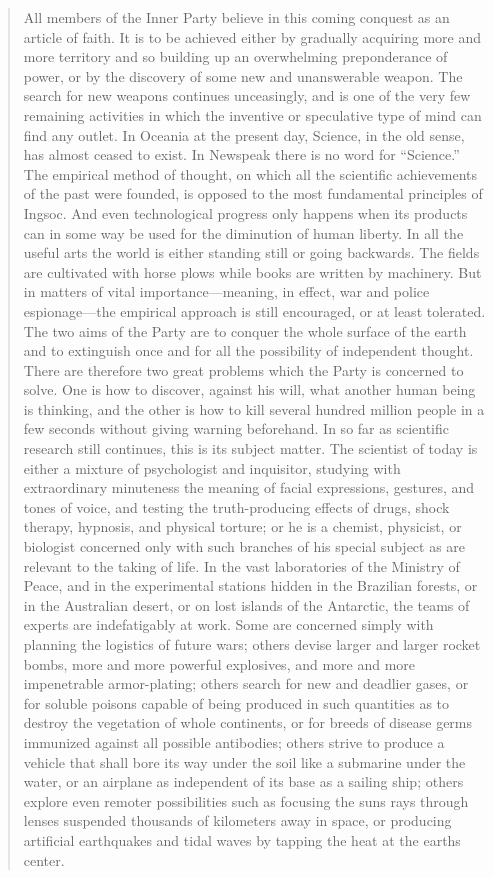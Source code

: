 \begin{quotation}
All members of the Inner Party believe in this coming conquest as an
article of faith. It is to be achieved either by gradually acquiring
more and more territory and so building up an overwhelming preponderance
of power, or by the discovery of some new and unanswerable weapon. The
search for new weapons continues unceasingly, and is one of the very few
remaining activities in which the inventive or speculative type of mind
can find any outlet. In Oceania at the present day, Science, in the old
sense, has almost ceased to exist. In Newspeak there is no word for
``Science.'' The empirical method of thought, on which all the scientific
achievements of the past were founded, is opposed to the most
fundamental principles of Ingsoc. And even technological progress only
happens when its products can in some way be used for the diminution of
human liberty. In all the useful arts the world is either standing still
or going backwards. The fields are cultivated with horse plows while
books are written by machinery. But in matters of vital
importance---meaning, in effect, war and police espionage---the
empirical approach is still encouraged, or at least tolerated. The two
aims of the Party are to conquer the whole surface of the earth and to
extinguish once and for all the possibility of independent thought.
There are therefore two great problems which the Party is concerned to
solve. One is how to discover, against his will, what another human
being is thinking, and the other is how to kill several hundred million
people in a few seconds without giving warning beforehand. In so far as
scientific research still continues, this is its subject matter. The
scientist of today is either a mixture of psychologist and inquisitor,
studying with extraordinary minuteness the meaning of facial
expressions, gestures, and tones of voice, and testing the
truth-producing effects of drugs, shock therapy, hypnosis, and physical
torture; or he is a chemist, physicist, or biologist concerned only with
such branches of his special subject as are relevant to the taking of
life. In the vast laboratories of the Ministry of Peace, and in the
experimental stations hidden in the Brazilian forests, or in the
Australian desert, or on lost islands of the Antarctic, the teams of
experts are indefatigably at work. Some are concerned simply with
planning the logistics of future wars; others devise larger and larger
rocket bombs, more and more powerful explosives, and more and more
impenetrable armor-plating; others search for new and deadlier gases, or
for soluble poisons capable of being produced in such quantities as to
destroy the vegetation of whole continents, or for breeds of disease
germs immunized against all possible antibodies; others strive to
produce a vehicle that shall bore its way under the soil like a
submarine under the water, or an airplane as independent of its base as
a sailing ship; others explore even remoter possibilities such as
focusing the sun\textquotesingle s rays through lenses suspended
thousands of kilometers away in space, or producing artificial
earthquakes and tidal waves by tapping the heat at the
earth\textquotesingle s center.
\end{quotation}

